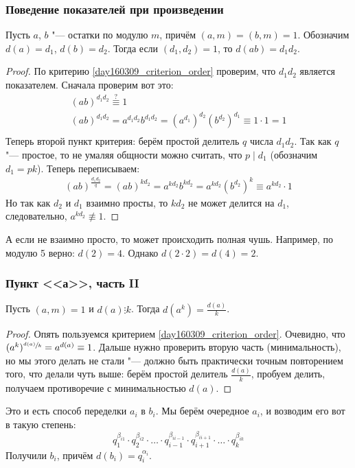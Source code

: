 	\subsubsection{Поведение показателей при произведении}
		\begin{lemma}
			Пусть $a$, $b$ "--- остатки по модулю $m$, причём $(a, m)=(b, m)=1$.
			Обозначим $d(a)=d_1$, $d(b)=d_2$.
			Тогда если $(d_1, d_2)=1$, то $d(ab)=d_1d_2$.
		\end{lemma}
		\begin{proof}
			По критерию \ref{day160309_criterion_order} проверим, что $d_1d_2$ является показателем.
			Сначала проверим вот это:
			\begin{gather*}
				(ab)^{d_1d_2} \stackrel{?}{\equiv} 1 \\
				(ab)^{d_1d_2} = a^{d_1d_2}b^{d_1d_2} = (a^{d_1})^{d_2}(b^{d_2})^{d_1} \equiv 1 \cdot 1 = 1 \\
			\end{gather*}
			Теперь второй пункт критерия: берём простой делитель $q$ числа $d_1d_2$.
			Так как $q$ "--- простое, то не умаляя общности можно считать, что $p\mid d_1$
			(обозначим $d_1=pk$).
			Теперь переписываем:
			\begin{gather*}
				(ab)^{\frac{d_1d_2}q} =
				(ab)^{kd_2} =
				a^{kd_2} b^{kd_2} =
				a^{kd_2} \left(b^{d_2}\right)^{k} \equiv
				a^{kd_2} \cdot 1
			\end{gather*}
			Но так как $d_2$ и $d_1$ взаимно просты, то $kd_2$ не может делится на $d_1$,
			следовательно, $a^{kd_2} \nequiv 1$.
		\end{proof}
		\begin{Rem}
			А если не взаимно просто, то может происходить полная чушь.
			Например, по модулю 5 верно: $d(2)=4$.
			Однако $d(2\cdot 2)=d(4)=2$.
		\end{Rem}

	\subsubsection{Пункт <<а>>, часть II}
		\begin{lemma}
			Пусть $(a, m)=1$ и $d(a)\vdots k$.
			Тогда $d(a^k) = \frac{d(a)}{k}$.
		\end{lemma}
		\begin{proof}
			Опять пользуемся критерием \ref{day160309_criterion_order}.
			Очевидно, что $(a^k)^{\sfrac{d(a)}{k}} = a^{d(a)} \equiv 1$.
			Дальше нужно проверить вторую часть (минимальность), но мы этого делать
			не стали "--- должно быть практически точным повторением того, что делали чуть выше:
			берём простой делитель $\frac{d(a)}{k}$, пробуем делить, получаем противоречие с минимальностью
			$d(a)$.
		\end{proof}
		Это и есть способ переделки $a_i$ в $b_i$.
		Мы берём очередное $a_i$, и возводим его вот в такую степень:
		\[
			q_1^{\beta_{i1}} \cdot
			q_2^{\beta_{i2}} \cdot
			\dots \cdot
			q_{i-1}^{\beta_{i{i-1}}} \cdot
			q_{i+1}^{\beta_{i{i+1}}} \cdot
			\dots \cdot
			q_k^{\beta_{ik}} \]
		Получили $b_i$, причём $d(b_i)=q_i^{\alpha_i}$.

